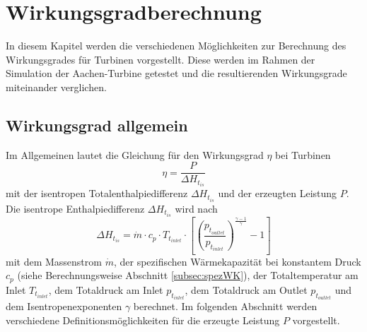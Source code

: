 \chapter{Wirkungsgradberechnung}
\label{cha:wgberechnung}
In diesem Kapitel werden die verschiedenen Möglichkeiten zur Berechnung des Wirkungsgrades für Turbinen vorgestellt. Diese werden im Rahmen der Simulation der Aachen-Turbine getestet und die resultierenden Wirkungsgrade miteinander verglichen.
\section{Wirkungsgrad allgemein}
Im Allgemeinen lautet die Gleichung für den Wirkungsgrad $\eta$ bei Turbinen 
\begin{equation}
\label{eq:wgallgemein}
\eta =\frac{P}{\Delta H_{t_{is}}}
\end{equation}
mit der isentropen Totalenthalpiedifferenz $\Delta H_{t_{is}}$ und der erzeugten Leistung $P$.
Die isentrope Enthalpiedifferenz $\Delta H_{t_{is}}$ wird nach
\begin{equation}
\label{eq:wgnenner}
\Delta H_{t_{is}} = \dot m \cdot c_p \cdot T_{t_{inlet}} \cdot \left[ \left( \frac{p_{t_{outlet}}}{p_{t_{inlet}}}\right)^\frac{\gamma-1}{\gamma}-1\right]
\end{equation}
mit dem Massenstrom $\dot m$, der spezifischen Wärmekapazität bei konstantem Druck $c_p$ (siehe Berechnungsweise Abschnitt \ref{subsec:spezWK}), der Totaltemperatur am Inlet $T_{t_{inlet}}$, dem Totaldruck am Inlet $p_{t_{inlet}}$, dem Totaldruck am Outlet $p_{t_{outlet}}$ und dem Isentropenexponenten $\gamma$ berechnet.\newline 
Im folgenden Abschnitt werden verschiedene Definitionsmöglichkeiten für die erzeugte Leistung $P$ vorgestellt.
